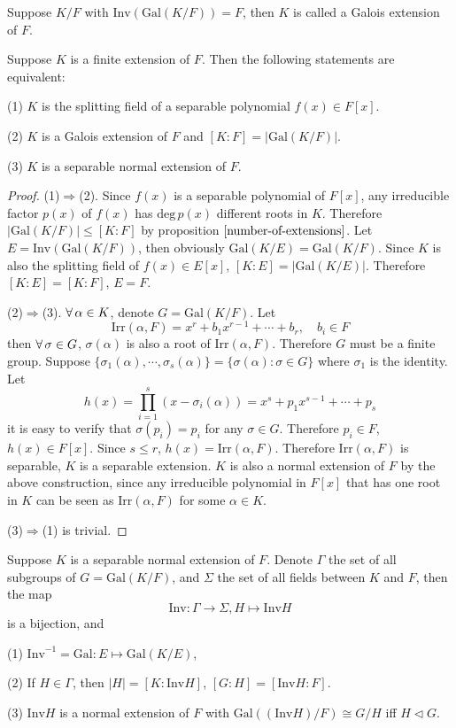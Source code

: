 \begin{definition}
    Suppose $K/F$ with $\mathrm{Inv}(\mathrm{Gal}(K/F))=F$, then $K$ is called a Galois extension of $F$.
\end{definition}
\begin{proposition}
    Suppose $K$ is a finite extension of $F$. Then the following statements are equivalent:
    \par (1) $K$ is the splitting field of a separable polynomial $f(x)\in F[x]$.
    \par (2) $K$ is a Galois extension of $F$ and $[K:F]=|\mathrm{Gal}(K/F)|$.
    \par (3) $K$ is a separable normal extension of $F$.
\end{proposition}
\begin{proof}
    (1)$\Rightarrow$(2). Since $f(x)$ is a separable polynomial of $F[x]$, any irreducible factor $p(x)$ of $f(x)$ has $\mathrm{deg}\,p(x)$ different roots in $K$. Therefore $|\mathrm{Gal}(K/F)|\le[K:F]$ by proposition $\ref{number-of-extensions}$. Let $E=\mathrm{Inv}(\mathrm{Gal}(K/F))$, then obviously $\mathrm{Gal}(K/E)=\mathrm{Gal}(K/F)$. Since $K$ is also the splitting field of $f(x)\in E[x]$, $[K:E]=|\mathrm{Gal}(K/E)|$. Therefore $[K:E]=[K:F]$, $E=F$.
    \par (2)$\Rightarrow$(3). $\forall\,\alpha\in K$, denote $G=\mathrm{Gal}(K/F)$. Let
    $$
    \mathrm{Irr}(\alpha,F)=x^r+b_1x^{r-1}+\cdots+b_r,\quad b_i\in F
    $$
    then $\forall\,\sigma\in G$, $\sigma(\alpha) $ is also a root of $\mathrm{Irr}(\alpha,F)$. Therefore $G$ must be a finite group. Suppose $\{\sigma_1(\alpha),\cdots,\sigma_s(\alpha)\}=\{\sigma(\alpha):\sigma\in G\}$ where $\sigma_1$ is the identity. Let 
    $$
    h(x)=\prod^{s}_{i=1}(x-\sigma_i(\alpha))=x^s+p_1x^{s-1}+\cdots+p_s
    $$
    it is easy to verify that $\sigma(p_i)=p_i$ for any $\sigma\in G$. Therefore $p_i\in F$, $h(x)\in F[x]$. Since $s\le r$, $h(x)=\mathrm{Irr}(\alpha,F)$. Therefore $\mathrm{Irr}(\alpha,F)$ is separable, $K$ is a separable extension. $K$ is also a normal extension of $F$ by the above construction, since any irreducible polynomial in $F[x]$ that has one root in $K$ can be seen as $\mathrm{Irr}(\alpha,F)$ for some $\alpha\in K$.
    \par (3)$\Rightarrow$(1) is trivial.
\end{proof}
\begin{theorem}
    Suppose $K$ is a separable normal extension of $F$. Denote $\varGamma$ the set of all subgroups of $G=\mathrm{Gal}(K/F)$, and $\varSigma$ the set of all fields between $K$ and $F$, then the map
    $$
    \mathrm{Inv}:\varGamma\to\varSigma,H\mapsto\mathrm{Inv}H
    $$ is a bijection, and
    \par(1) $\mathrm{Inv}^{-1}=\mathrm{Gal}:E\mapsto\mathrm{Gal}(K/E)$,
    \par(2) If $H\in\varGamma$, then $|H|=[K:\mathrm{Inv}H]$, $[G:H]=[\mathrm{Inv}H:F]$.
    \par(3) $\mathrm{Inv}H$ is a normal extension of $F$ with $\mathrm{Gal}((\mathrm{Inv}H)/F)\cong G/H$ iff $H\triangleleft G$.
\end{theorem}
